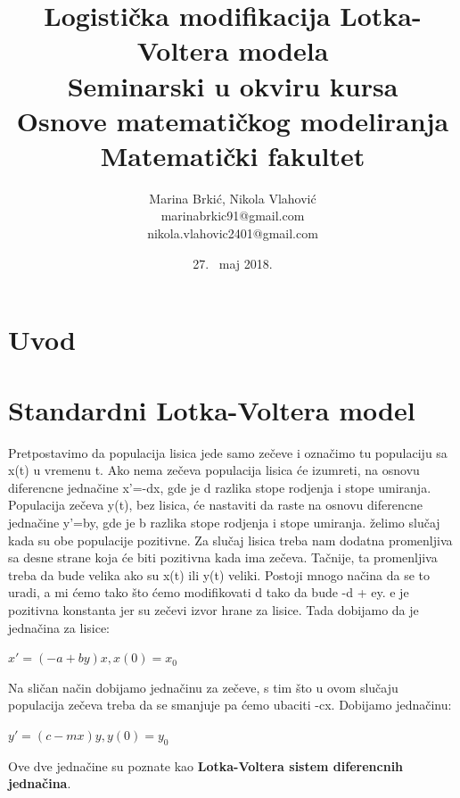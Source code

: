 \documentclass[a4paper]{article}
\begin{document}
\title{Logistička modifikacija Lotka-Voltera modela\\
	\small{Seminarski u okviru kursa\\Osnove matematičkog modeliranja\\Matematički fakultet}
}
\author{Marina Brkić, Nikola Vlahović\\marinabrkic91@gmail.com\\nikola.vlahovic2401@gmail.com}
\date{27. ~maj 2018.}
\maketitle
{}
\tableofcontents

\newpage

\section{Uvod}
\label{sec:uvod}

\section{Standardni Lotka-Voltera model}
\label{sec:std_model}
Pretpostavimo da populacija lisica jede samo zečeve i označimo
tu populaciju sa x(t) u vremenu t.
Ako nema zečeva populacija lisica će izumreti, na
osnovu diferencne jednačine x'=-dx, gde je d razlika stope rodjenja i stope umiranja.
Populacija zečeva y(t), bez lisica, će nastaviti da raste na osnovu diferencne jednačine y'=by, gde je b razlika stope rodjenja i stope umiranja.
želimo slučaj kada su obe populacije pozitivne. Za slučaj lisica treba nam dodatna promenljiva
sa desne strane koja će biti pozitivna kada ima zečeva. Tačnije, ta promenljiva treba da bude velika ako su
x(t) ili y(t) veliki. Postoji mnogo načina da se to uradi, a mi ćemo tako što ćemo modifikovati d tako da bude
-d + ey. e je pozitivna konstanta jer su zečevi izvor hrane za lisice. Tada dobijamo da je jednačina za lisice:
		\begin{center}
		$x' = (-a + by)x,   x(0)=x_0$
		\end{center}
Na sličan način dobijamo jednačinu za zečeve, s tim što u ovom slučaju populacija zečeva treba da se smanjuje pa ćemo ubaciti -cx. Dobijamo jednačinu: 
		\begin{center}
		$y' = (c - mx)y,  y(0)=y_0$
		\end{center}
Ove dve jednačine su poznate kao \textbf{Lotka-Voltera sistem diferencnih jednačina}. \\
\end{document}
